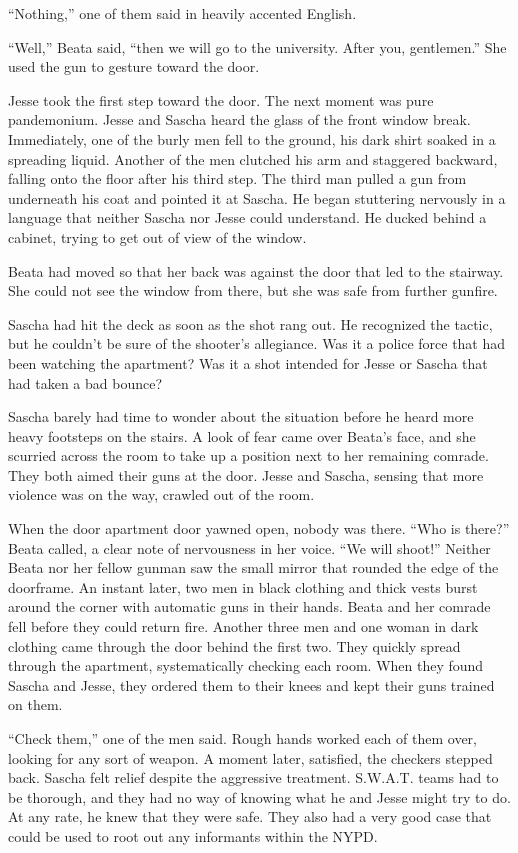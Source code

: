 \documentclass[12pt]{book}
\begin{document}
``Nothing,'' one of them said in heavily accented English.

``Well,'' Beata said, ``then we will go to the university.  After you, gentlemen.''  She used the gun to gesture toward the door.

Jesse took the first step toward the door.  The next moment was pure pandemonium.  Jesse and Sascha heard the glass of the front window break.  Immediately, one of the burly men fell to the ground, his dark shirt soaked in a spreading liquid.  Another of the men clutched his arm and staggered backward, falling onto the floor after his third step.  The third man pulled a gun from underneath his coat and pointed it at Sascha.  He began stuttering nervously in a language that neither Sascha nor Jesse could understand.  He ducked behind a cabinet, trying to get out of view of the window.

Beata had moved so that her back was against the door that led to the stairway.  She could not see the window from there, but she was safe from further gunfire.

Sascha had hit the deck as soon as the shot rang out.  He recognized the tactic, but he couldn't be sure of the shooter's allegiance.  Was it a police force that had been watching the apartment?  Was it a shot intended for Jesse or Sascha that had taken a bad bounce?

Sascha barely had time to wonder about the situation before he heard more heavy footsteps on the stairs.  A look of fear came over Beata's face, and she scurried across the room to take up a position next to her remaining comrade.  They both aimed their guns at the door.  Jesse and Sascha, sensing that more violence was on the way, crawled out of the room.

When the door apartment door yawned open, nobody was there.  ``Who is there?'' Beata called, a clear note of nervousness in her voice.  ``We will shoot!''  Neither Beata nor her fellow gunman saw the small mirror that rounded the edge of the doorframe.  An instant later, two men in black clothing and thick vests burst around the corner with automatic guns in their hands.  Beata and her comrade fell before they could return fire.  Another three men and one woman in dark clothing came through the door behind the first two.  They quickly spread through the apartment, systematically checking each room.  When they found Sascha and Jesse, they ordered them to their knees and kept their guns trained on them.

``Check them,'' one of the men said.  Rough hands worked each of them over, looking for any sort of weapon.  A moment later, satisfied, the checkers stepped back.  Sascha felt relief despite the aggressive treatment.  S.W.A.T. teams had to be thorough, and they had no way of knowing what he and Jesse might try to do.  At any rate, he knew that they were safe.  They also had a very good case that could be used to root out any informants within the NYPD.
\end{document}
